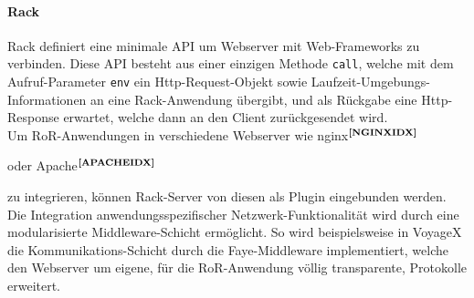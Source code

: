 \paragraph{Rack}
Rack definiert eine minimale API um Webserver mit Web-Frameworks zu verbinden.\cite{RACK:INTRO}
Diese API besteht aus einer einzigen Methode \texttt{call}, welche mit dem Aufruf-Parameter \texttt{env} ein Http-Request-Objekt sowie Laufzeit-Umgebungs-Informationen an eine Rack-Anwendung übergibt, und als Rückgabe eine Http-Response erwartet, welche dann an den Client zurückgesendet wird.\\
Um RoR-Anwendungen in verschiedene Webserver wie nginx$^{\textbf{\ref{NGINXIDX}}}$%
\addtocounter{footnote}{1}%
oder Apache$^{\textbf{\ref{APACHEIDX}}}$%
\addtocounter{footnote}{1}%
zu integrieren, können Rack-Server von diesen als Plugin eingebunden werden. Die Integration anwendungsspezifischer Netzwerk-Funktionalität wird durch eine modularisierte Middleware-Schicht ermöglicht. So wird beispielsweise in VoyageX die Kommunikations-Schicht durch die Faye-Middleware implementiert, welche den Webserver um eigene, für die RoR-Anwendung völlig transparente, Protokolle erweitert.\\

